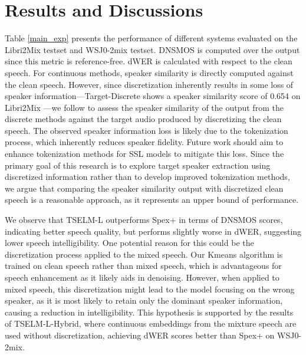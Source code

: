 \documentclass[conference]{IEEEtran}
\begin{document}
\section{Results and Discussions}
Table \ref{main_exp} presents the performance of different systems evaluated on the Libri2Mix testset and WSJ0-2mix testset. 
DNSMOS is computed over the 
output since this metric is reference-free. dWER is calculated with respect to the clean speech. 
For continuous methods, speaker similarity is directly computed against the clean speech. 
However, since discretization inherently results in some loss of speaker information—Target-Discrete shows a speaker similarity score of 0.654 on Libri2Mix —we follow \cite{dasb} to assess the speaker similarity of the output from the discrete methods against the target audio produced by discretizing the clean speech. 
The observed speaker information loss is likely due to the tokenization process, which inherently reduces speaker fidelity. Future work should aim to enhance tokenization methods for SSL models to mitigate this loss. Since the primary goal of this research is to explore target speaker extraction using discretized information rather than to develop improved tokenization methods, we argue that comparing the speaker similarity output with discretized clean speech is a reasonable approach, as it represents an upper bound of performance.

We observe that TSELM-L outperforms Spex+ in terms of DNSMOS scores, indicating better speech quality, but performs slightly worse in dWER, suggesting lower speech intelligibility. One potential reason for this could be the discretization process applied to the mixed speech. Our Kmeans algorithm is trained on clean speech rather than mixed speech, which is advantageous for speech enhancement as it likely aids in denoising. However, when applied to mixed speech, this discretization might lead to the model focusing on the wrong speaker, as it is most likely to retain only the dominant speaker information, causing a reduction in intelligibility.
This hypothesis is supported by the results of TSELM-L-Hybrid, where continuous embeddings from the mixture speech are used without discretization, achieving dWER scores better than Spex+ on WSJ0-2mix. 
\end{document}
